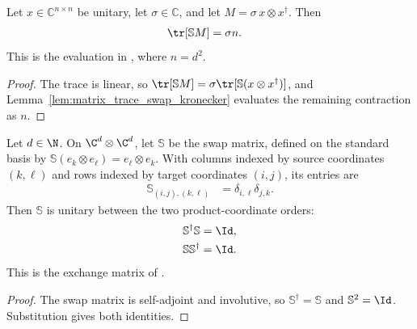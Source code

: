 \begin{lemma}
    \label{thm:matrix_trace_swap_scaled_kronecker}
    \leanok
    Let $x\in\mathbb C^{n\times n}$ be unitary, let $\sigma\in\mathbb C$, and let
    $M=\sigma\,x\otimes x^\dagger$. Then
    \begin{align}
        \tr\!\left[\mathbb SM\right] & =\sigma n.
    \end{align}
    This is the evaluation in \cite[lines~1608--1610]{Cirac2017MPU}, where
    $n=d^2$.
\end{lemma}

\begin{proof}\leanok
    The trace is linear, so
    $\tr[\mathbb SM]=\sigma\tr[\mathbb S(x\otimes x^\dagger)]$, and
    Lemma~\ref{lem:matrix_trace_swap_kronecker} evaluates the remaining
    contraction as $n$.
\end{proof}

\begin{lemma}
    \label{thm:mpu_swap_matrix_unitary}
    \leanok
    Let $d\in\N$. On $\C^d\otimes\C^d$, let $\mathbb S$ be the swap matrix,
    defined on the standard basis by
    $\mathbb S(e_k\otimes e_\ell)=e_\ell\otimes e_k$. With columns indexed by
    source coordinates $(k,\ell)$ and rows indexed by target coordinates
    $(i,j)$, its entries are
    \begin{align}
        \mathbb S_{(i,j),(k,\ell)} & =\delta_{i,\ell}\delta_{j,k}.
    \end{align}
    Then $\mathbb S$ is unitary between the two product-coordinate orders:
    \begin{align}
        \mathbb S^\dagger\mathbb S & =\Id, \\
        \mathbb S\mathbb S^\dagger & =\Id.
    \end{align}
    This is the exchange matrix of \cite[lines~2009--2034]{Cirac2017MPU}.
\end{lemma}

\begin{proof}\leanok
    The swap matrix is self-adjoint and involutive, so
    $\mathbb S^\dagger=\mathbb S$ and $\mathbb S^2=\Id$. Substitution gives
    both identities.
\end{proof}

